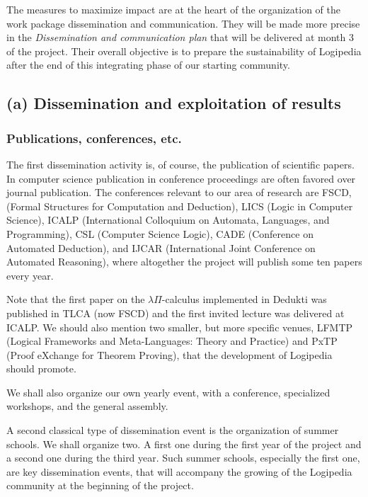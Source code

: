 The measures to maximize impact are at the heart of the organization
of the work package dissemination and communication. They will be made
more precise
in the {\em Dissemination and communication plan} that will be
delivered at month 3 of the project. Their overall objective is to
prepare the sustainability of Logipedia after the end of this
integrating phase of our starting community.

\subsection*{(a) Dissemination and exploitation of results}
\label{sec:dissemination}

\subsubsection*{Publications, conferences, etc.}

The first dissemination activity is, of course, the publication of
scientific papers. In computer science publication in conference
proceedings are often favored over journal publication. The
conferences relevant to our area of research are FSCD, (Formal
Structures for Computation and Deduction), LICS (Logic in Computer
Science), ICALP (International Colloquium on Automata, Languages, and
Programming), CSL (Computer Science Logic), CADE (Conference on
Automated Deduction), and IJCAR (International Joint Conference on
Automated Reasoning), where altogether the project will publish some
ten papers every year.

Note that the first paper on the $\lambda
\Pi$-calculus implemented in Dedukti was published in TLCA (now FSCD)
and the first invited lecture was delivered at ICALP. We should also
mention two smaller, but more specific venues, LFMTP (Logical
Frameworks and Meta-Languages: Theory and Practice) and PxTP (Proof
eXchange for Theorem Proving), that the development of Logipedia
should promote.

We shall also organize our own yearly event, with a conference,
specialized workshops, and the general assembly.

A second classical type of dissemination event is the organization of
summer schools. We shall organize two. A first one during the first
year of the project and a second one during the third year. Such summer
schools, especially the first one, are key dissemination events, that
will accompany the growing of the Logipedia community at the beginning 
of the project.

